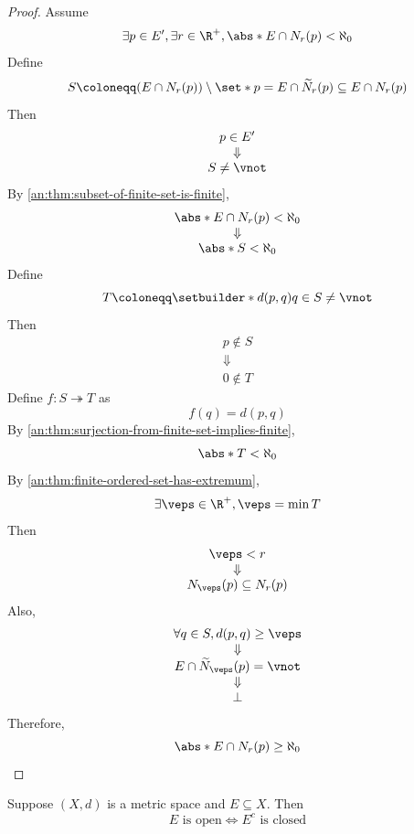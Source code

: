 \begin{proof}
  Assume
  \[
    \exists p \in E', \exists r \in \R^{+}, \abs*{E \cap N_{r}(p)} < \aleph_{0}
  \]
  Define
  \[
    S \coloneqq (E \cap N_{r}(p)) \setminus \set*{p} = E \cap \widetilde{N}_{r}(p) \subseteq E \cap N_{r}(p)
  \]
  Then
  \[
    \begin{array}{c}
      p \in E'   \\
      \Downarrow \\
      S \neq \vnot
    \end{array}
  \]
  By \cref{an:thm:subset-of-finite-set-is-finite},
  \[
    \begin{array}{c}
      \abs*{E \cap N_{r}(p)} < \aleph_{0} \\
      \Downarrow                          \\
      \abs*{S} < \aleph_{0}
    \end{array}
  \]
  Define
  \[
    T \coloneqq \setbuilder*{d(p, q)}{q \in S} \neq \vnot
  \]
  Then
  \[
    \begin{array}{c}
      p \notin S \\
      \Downarrow \\
      0 \notin T
    \end{array}
  \]
  Define $f: S \twoheadrightarrow T$ as
  \[
    f(q) = d(p, q)
  \]
  By \cref{an:thm:surjection-from-finite-set-implies-finite},
  \[
    \abs*{T} < \aleph_{0}
  \]
  By \cref{an:thm:finite-ordered-set-has-extremum},
  \[
    \exists \veps \in \R^{+}, \veps = \min T
  \]
  Then
  \[
    \begin{array}{c}
      \veps < r  \\
      \Downarrow \\
      N_{\veps}(p) \subseteq N_{r}(p)
    \end{array}
  \]
  Also,
  \[
    \begin{array}{c}
      \forall q \in S, d(p, q) \geq \veps     \\
      \Downarrow                              \\
      E \cap \widetilde{N}_{\veps}(p) = \vnot \\
      \Downarrow                              \\
      \bot
    \end{array}
  \]
  Therefore,
  \[
    \abs*{E \cap N_{r}(p)} \geq \aleph_{0}
  \]
\end{proof}

\bigskip

\begin{theorem} \label{an:thm:open-set-complement-is-closed-set}
  Suppose $(X, d)$ is a metric space and $E \subseteq X$. Then
  \[
    E \text{ is open} \iff E^{c} \text{ is closed}
  \]
\end{theorem}

